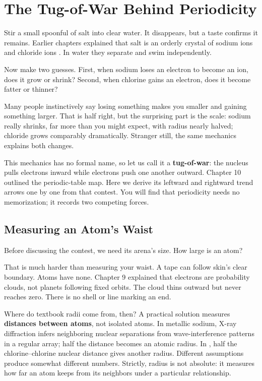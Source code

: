 \chapter{The Tug-of-War Behind Periodicity}

\begin{kaichang}
Stir a small spoonful of salt into clear water. It disappears, but a taste confirms it remains. Earlier chapters explained that salt is an orderly crystal of sodium ions  and chloride ions . In water they separate and swim independently.

Now make two guesses. First, when sodium  loses an electron to become an ion, does it grow or shrink? Second, when chlorine  gains an electron, does it become fatter or thinner?

Many people instinctively say losing something makes you smaller and gaining something larger. That is half right, but the surprising part is the scale: sodium really shrinks, far more than you might expect, with radius nearly halved; chloride grows comparably dramatically. Stranger still, the same mechanics explains both changes.

This mechanics has no formal name, so let us call it a \textbf{tug-of-war}: the nucleus pulls electrons inward while electrons push one another outward. Chapter 10 outlined the periodic-table map. Here we derive its leftward and rightward trend arrows one by one from that contest. You will find that periodicity needs no memorization; it records two competing forces.
\end{kaichang}

\section{Measuring an Atom's Waist}

Before discussing the contest, we need its arena's size. How large is an atom?

That is much harder than measuring your waist. A tape can follow skin's clear boundary. Atoms have none. Chapter 9 explained that electrons are probability clouds, not planets following fixed orbits. The cloud thins outward but never reaches zero. There is no shell or line marking an end.

Where do textbook radii come from, then? A practical solution measures \textbf{distances between atoms}, not isolated atoms. In metallic sodium, X-ray diffraction infers neighboring nuclear separations from wave-interference patterns in a regular array; half the distance becomes an atomic radius. In , half the chlorine--chlorine nuclear distance gives another radius. Different assumptions produce somewhat different numbers. Strictly, radius is not absolute: it measures how far an atom keeps from its neighbors under a particular relationship.

